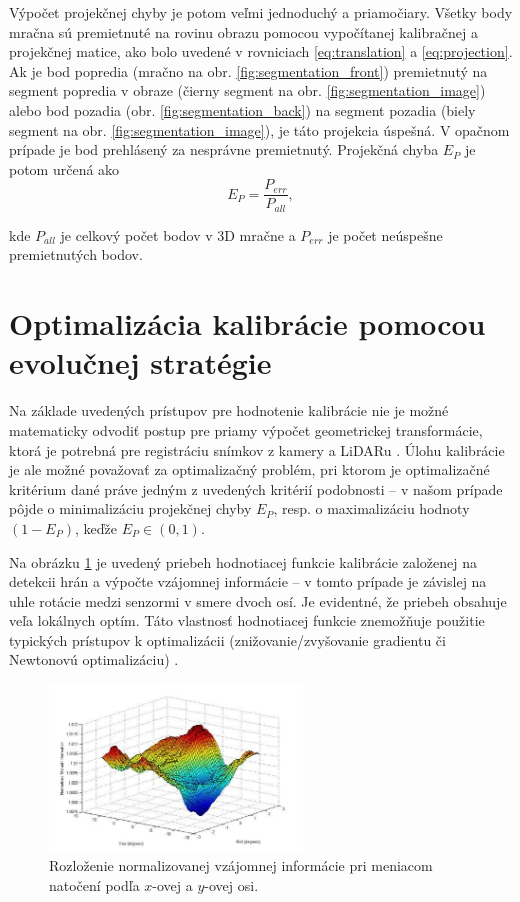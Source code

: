 \documentclass[12pt, a4paper]{article}
\begin{document}
Výpočet projekčnej chyby je potom veľmi jednoduchý a priamočiary. Všetky body mračna sú premietnuté na rovinu obrazu pomocou vypočítanej kalibračnej a projekčnej matice, ako bolo uvedené v rovniciach \ref{eq:translation} a \ref{eq:projection}. Ak je bod popredia (mračno na obr. \ref{fig:segmentation_front}) premietnutý na segment popredia v obraze (čierny segment na obr. \ref{fig:segmentation_image}) alebo bod pozadia (obr. \ref{fig:segmentation_back}) na segment pozadia (biely segment na obr. \ref{fig:segmentation_image}), je táto projekcia úspešná. V opačnom prípade je bod prehlásený za nesprávne premietnutý. Projekčná chyba $E_P$ je potom určená ako
\begin{equation}
	E_P = \dfrac{P_{err}}{P_{all}},
\end{equation}

kde $P_{all}$ je celkový počet bodov v $3$D mračne a $P_{err}$ je počet neúspešne premietnutých bodov.

\section{Optimalizácia kalibrácie pomocou evolučnej stratégie}

Na základe uvedených prístupov pre hodnotenie kalibrácie nie je možné matematicky odvodiť postup pre priamy výpočet geometrickej transformácie, ktorá je potrebná pre registráciu snímkov z kamery a LiDARu \cite{jan}. Úlohu kalibrácie je ale možné považovať za optimalizačný problém, pri ktorom je optimalizačné kritérium dané práve jedným z uvedených kritérií podobnosti -- v našom prípade pôjde o minimalizáciu projekčnej chyby $E_P$, resp. o maximalizáciu hodnoty $(1-E_P)$, keďže $E_P \in (0,1)$.

Na obrázku \ref{fig:nmi} je uvedený priebeh hodnotiacej funkcie kalibrácie založenej na detekcii hrán a výpočte vzájomnej informácie -- v tomto prípade je závislej na uhle rotácie medzi senzormi v smere dvoch osí. Je evidentné, že priebeh obsahuje veľa lokálnych optím. Táto vlastnosť hodnotiacej funkcie znemožňuje použitie typických prístupov k optimalizácii (znižovanie/zvyšovanie gradientu či Newtonovú optimalizáciu) \cite{jan}.

\begin{figure}[h]
\center
	\includegraphics[width=0.6\textwidth]{fig/nmi_values.jpg}
\caption{Rozloženie normalizovanej vzájomnej informácie pri meniacom natočení podľa $x$-ovej a $y$-ovej osi.\cite{taylor}\label{fig:nmi}}
\end{figure}
\end{document}
